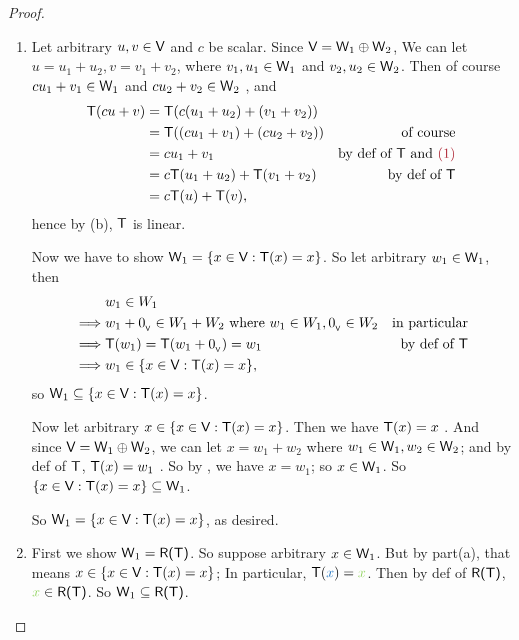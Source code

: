 \begin{proof} \ 
\begin{enumerate}
\item
Let arbitrary \(u, v \in \textsf{V}\) and \(c\) be scalar.
Since \(\textsf{V} = \textsf{W}_1 \oplus \textsf{W}_2\), We can let \(u = u_1 + u_2, v = v_1 + v_2\), where \(v_1, u_1 \in \textsf{W}_1\) and \(v_2, u_2 \in \textsf{W}_2\).
Then of course \(c u_1 + v_1 \in \textsf{W}_1\) and \(c u_2 + v_2 \in \textsf{W}_2\) \MAROON{(1)}, and
\begin{align*}
    \T(cu + v) & = \T(c(u_1 + u_2) + (v_1 + v_2)) \\
               & = \T((c u_1 + v_1) + (c u_2 + v_2)) & \text{of course} \\
               & = c u_1 + v_1 & \text{by def of \(\T\) and \MAROON{(1)}} \\
               & = c \T(u_1 + u_2) + \T(v_1 + v_2) & \text{by def of \(\T\)} \\
               & = c \T(u) + \T(v),
\end{align*}
hence by (b), \(\textsf{T}\) is linear.

Now we have to show \(\textsf{W}_1 = \{ x \in \textsf{V} : \textsf{T}(x) = x \}\).
So let arbitrary \(w_1 \in \textsf{W}_1\), then
\begin{align*}
             & w_1 \in W_1 \\
    \implies & w_1 + 0_{_{\textsf{V}}} \in W_1 + W_2 \text{ where } w_1 \in W_1, 0_{_{\textsf{V}}} \in W_2 & \text{in particular} \\
    \implies & \textsf{T}(w_1) = \textsf{T}(w_1 + 0_{_{\textsf{V}}}) = w_1 & \text{by def of \(\textsf{T}\)} \\
    \implies & w_1 \in \{ x \in \textsf{V} : \textsf{T}(x) = x \},
\end{align*}
so \(\textsf{W}_1 \subseteq \{ x \in \textsf{V} : \textsf{T}(x) = x \}\).

Now let arbitrary \(x \in \{ x \in \textsf{V} : \textsf{T}(x) = x \}\).
Then we have \(\textsf{T}(x) = x\) .
And since \(\textsf{V} = \textsf{W}_1 \oplus \textsf{W}_2\), we can let \(x = w_1 + w_2\) where \(w_1 \in \textsf{W}_1, w_2 \in \textsf{W}_2\);
and by def of \(\textsf{T}\), \(\textsf{T}(x) = w_1\) \MAROON{(3)}.
So by , we have \(x = w_1\); so \(x \in \textsf{W}_1\).
So \(\{ x \in \textsf{V} : \textsf{T}(x) = x \} \subseteq \textsf{W}_1\).

So \(\textsf{W}_1 = \{ x \in \textsf{V} : \textsf{T}(x) = x\}\), as desired.

\item
First we show \(\textsf{W}_1 = \textsf{R(T)}\).
So suppose arbitrary \(x \in \textsf{W}_1\).
But by part(a), that means \(x \in \{x \in \textsf{V} : \textsf{T}(x) = x\}\);
In particular, \(\T(\BLUE{x}) = \GREEN{x}\).
Then by def of \(\textsf{R(T)}\), \(\GREEN{x} \in \RANGET\).
So \(\textsf{W}_1 \subseteq \textsf{R(T)}\).


\end{enumerate}
\end{proof}
